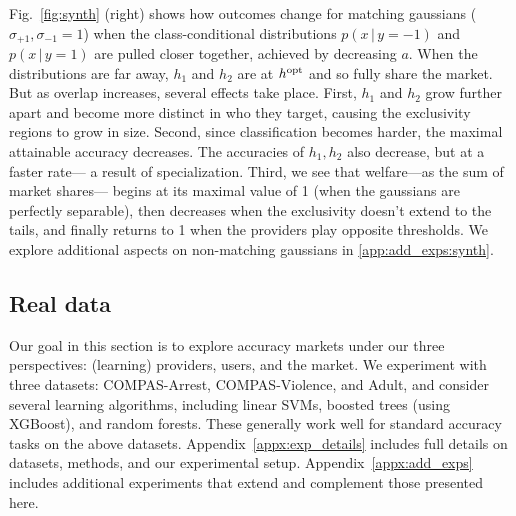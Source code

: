 Fig.~\ref{fig:synth} (right) shows how outcomes change for matching gaussians ($\sigma_{+1}, \sigma_{-1}=1$)
when the class-conditional distributions
$p(x\,|\,y=-1)$ and $p(x\,|\,y=1)$
are pulled closer together, achieved by decreasing $a$.
When the distributions are far away,
$h_1$ and $h_2$ are at $h^{\mathrm{opt}}$ and so fully share the market.
But as overlap increases, several effects take place.
First, $h_1$ and $h_2$ grow further apart and become more distinct in who they target,
causing the exclusivity regions to grow in size.
Second, since classification becomes harder,
the maximal attainable accuracy decreases.
The accuracies of $h_1,h_2$ also decrease, but at a faster rate---%
a result of specialization.
Third, we see that welfare---as the sum of market shares---
begins at its maximal value of 1 (when the gaussians are perfectly separable),
then decreases when the exclusivity doesn't extend to the tails, and finally returns to 1 when the providers play opposite thresholds.
We explore additional aspects on non-matching gaussians in \cref{app:add_exps:synth}.
\squeeze







\subsection{Real data}
\label{sec:exp:real}
Our goal in this section is to explore accuracy markets under
our three perspectives: (learning) providers, users, and the market.
We experiment with
three datasets: COMPAS-Arrest, COMPAS-Violence, and Adult,
and consider several learning algorithms, including
linear SVMs, boosted trees (using XGBoost), and random forests.
These generally work well for standard accuracy tasks on the above datasets.
Appendix~\ref{appx:exp_details} includes full details on datasets, methods, and our experimental setup.
Appendix~\ref{appx:add_exps} includes additional experiments that extend and complement those presented here.
\squeeze


